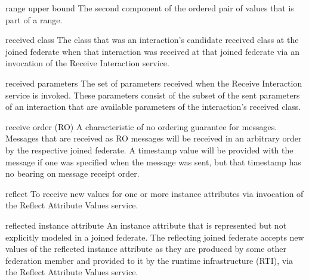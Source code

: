 
\begin{definition}{range upper bound}
    The second component of the ordered pair of values that is part of a range.
\end{definition}


\begin{definition}{received class}
    The class that was an interaction's candidate received class at the joined federate when that interaction was received at that joined federate via an invocation of the Receive Interaction \textdagger{} service.
\end{definition}


\begin{definition}{received parameters}
    The set of parameters received when the Receive Interaction \textdagger{} service is invoked. These parameters consist of the subset of the sent parameters of an interaction that are available parameters of the interaction's received class.
\end{definition}


\begin{definition}{receive order (RO)}
    A characteristic of no ordering guarantee for messages. Messages that are received as RO messages will be received in an arbitrary order by the respective joined federate. A timestamp value will be provided with the message if one was specified when the message was sent, but that timestamp has no bearing on message receipt order.
\end{definition}

\begin{definition}{reflect}
    To receive new values for one or more instance attributes via invocation of the Reflect Attribute Values \textdagger{} service.
\end{definition}


\begin{definition}{reflected instance attribute}
    An instance attribute that is represented but not explicitly modeled in a joined federate. The reflecting joined federate accepts new values of the reflected instance attribute as they are produced by some other federation member and provided to it by the runtime infrastructure (RTI), via the Reflect Attribute Values \textdagger{} service.
\end{definition}

